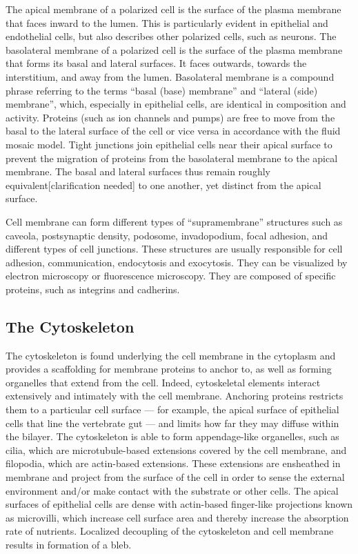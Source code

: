 \documentclass[
]{book}
\begin{document}
The apical membrane of a polarized cell is the surface of the plasma membrane that faces inward to the lumen. This is particularly evident in epithelial and endothelial cells, but also describes other polarized cells, such as neurons. The basolateral membrane of a polarized cell is the surface of the plasma membrane that forms its basal and lateral surfaces. It faces outwards, towards the interstitium, and away from the lumen. Basolateral membrane is a compound phrase referring to the terms ``basal (base) membrane'' and ``lateral (side) membrane'', which, especially in epithelial cells, are identical in composition and activity. Proteins (such as ion channels and pumps) are free to move from the basal to the lateral surface of the cell or vice versa in accordance with the fluid mosaic model. Tight junctions join epithelial cells near their apical surface to prevent the migration of proteins from the basolateral membrane to the apical membrane. The basal and lateral surfaces thus remain roughly equivalent{[}clarification needed{]} to one another, yet distinct from the apical surface.

Cell membrane can form different types of ``supramembrane'' structures such as caveola, postsynaptic density, podosome, invadopodium, focal adhesion, and different types of cell junctions. These structures are usually responsible for cell adhesion, communication, endocytosis and exocytosis. They can be visualized by electron microscopy or fluorescence microscopy. They are composed of specific proteins, such as integrins and cadherins.

\hypertarget{the-cytoskeleton}{%
\subsection{The Cytoskeleton}\label{the-cytoskeleton}}

The cytoskeleton is found underlying the cell membrane in the cytoplasm and provides a scaffolding for membrane proteins to anchor to, as well as forming organelles that extend from the cell. Indeed, cytoskeletal elements interact extensively and intimately with the cell membrane. Anchoring proteins restricts them to a particular cell surface --- for example, the apical surface of epithelial cells that line the vertebrate gut --- and limits how far they may diffuse within the bilayer. The cytoskeleton is able to form appendage-like organelles, such as cilia, which are microtubule-based extensions covered by the cell membrane, and filopodia, which are actin-based extensions. These extensions are ensheathed in membrane and project from the surface of the cell in order to sense the external environment and/or make contact with the substrate or other cells. The apical surfaces of epithelial cells are dense with actin-based finger-like projections known as microvilli, which increase cell surface area and thereby increase the absorption rate of nutrients. Localized decoupling of the cytoskeleton and cell membrane results in formation of a bleb.
\end{document}
